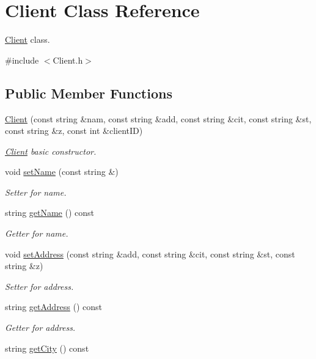 \hypertarget{classClient}{}\section{Client Class Reference}
\label{classClient}


\hyperlink{classClient}{Client} class.  




{\ttfamily \#include $<$Client.\+h$>$}

\subsection*{Public Member Functions}
\begin{DoxyCompactItemize}
\item 
\hyperlink{classClient_a8b477619887702b7a50b574819e746bd}{Client} (const string \&nam, const string \&add, const string \&cit, const string \&st, const string \&z, const int \&client\+ID)
\begin{DoxyCompactList}\small\item\em \hyperlink{classClient}{Client} basic constructor. \end{DoxyCompactList}\item 
void \hyperlink{classClient_ab78b7ecbedb2d6fc0e0df3dfa8c973bc}{set\+Name} (const string \&)\hypertarget{classClient_ab78b7ecbedb2d6fc0e0df3dfa8c973bc}{}\label{classClient_ab78b7ecbedb2d6fc0e0df3dfa8c973bc}

\begin{DoxyCompactList}\small\item\em Setter for name. \end{DoxyCompactList}\item 
string \hyperlink{classClient_a28a677584ad4793b50b31c2e75039e2c}{get\+Name} () const \hypertarget{classClient_a28a677584ad4793b50b31c2e75039e2c}{}\label{classClient_a28a677584ad4793b50b31c2e75039e2c}

\begin{DoxyCompactList}\small\item\em Getter for name. \end{DoxyCompactList}\item 
void \hyperlink{classClient_a69b7a62c15ec787ae86bb66ce4ad312a}{set\+Address} (const string \&add, const string \&cit, const string \&st, const string \&z)
\begin{DoxyCompactList}\small\item\em Setter for address. \end{DoxyCompactList}\item 
string \hyperlink{classClient_a291fb22c4fccb2a6b182c355078553ed}{get\+Address} () const 
\begin{DoxyCompactList}\small\item\em Getter for address. \end{DoxyCompactList}\item 
string \hyperlink{classClient_ad92aa60043bd899cdad19b9ca6a77a2e}{get\+City} () const \hypertarget{classClient_ad92aa60043bd899cdad19b9ca6a77a2e}{}\label{classClient_ad92aa60043bd899cdad19b9ca6a77a2e}


\end{DoxyCompactItemize}
